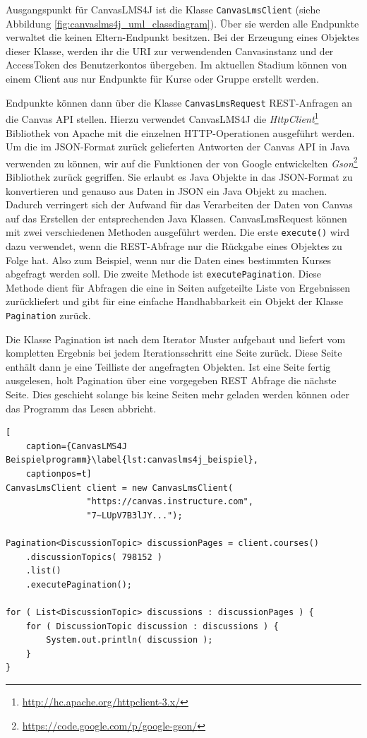 Ausgangspunkt für CanvasLMS4J ist die Klasse \texttt{CanvasLmsClient} (siehe Abbildung \ref{fig:canvaslms4j_uml_classdiagram}). Über sie werden alle Endpunkte verwaltet die keinen Eltern-Endpunkt besitzen. Bei der Erzeugung eines Objektes dieser Klasse, werden ihr die URI zur verwendenden Canvasinstanz und der AccessToken des Benutzerkontos übergeben. Im aktuellen Stadium können von einem Client aus nur Endpunkte für Kurse oder Gruppe erstellt werden.

Endpunkte können dann über die Klasse \texttt{CanvasLmsRequest} REST-Anfragen an die Canvas API stellen. Hierzu verwendet CanvasLMS4J die \emph{HttpClient}\footnote{\url{http://hc.apache.org/httpclient-3.x/}} Bibliothek von Apache mit die einzelnen HTTP-Operationen ausgeführt werden. Um die im JSON-Format zurück gelieferten Antworten der Canvas API in Java verwenden zu können, wir auf die Funktionen der von Google entwickelten \emph{Gson}\footnote{\url{https://code.google.com/p/google-gson/}} Bibliothek zurück gegriffen. Sie erlaubt es Java Objekte in das JSON-Format zu konvertieren und genauso aus Daten in JSON ein Java Objekt zu machen. Dadurch verringert sich der Aufwand für das Verarbeiten der Daten von Canvas auf das Erstellen der entsprechenden Java Klassen. CanvasLmsRequest können mit zwei verschiedenen Methoden ausgeführt werden. Die erste \texttt{execute()} wird dazu verwendet, wenn die REST-Abfrage nur die Rückgabe eines Objektes zu Folge hat. Also zum Beispiel, wenn nur die Daten eines bestimmten Kurses abgefragt werden soll. Die zweite Methode ist \texttt{executePagination}. Diese Methode dient für Abfragen die eine in Seiten aufgeteilte Liste von Ergebnissen zurückliefert und gibt für eine einfache Handhabbarkeit ein Objekt der Klasse \texttt{Pagination} zurück. 

Die Klasse Pagination ist nach dem Iterator Muster aufgebaut und liefert vom kompletten Ergebnis bei jedem Iterationsschritt eine Seite zurück. Diese Seite enthält dann je eine Teilliste der angefragten Objekten. Ist eine Seite fertig ausgelesen, holt Pagination über eine vorgegeben REST Abfrage die nächste Seite. Dies geschieht solange bis keine Seiten mehr geladen werden können oder das Programm das Lesen abbricht.

\begin{lstlisting}[
    caption={CanvasLMS4J Beispielprogramm}\label{lst:canvaslms4j_beispiel},
    captionpos=t]
CanvasLmsClient client = new CanvasLmsClient(
                "https://canvas.instructure.com",
                "7~LUpV7B3lJY...");

Pagination<DiscussionTopic> discussionPages = client.courses()
    .discussionTopics( 798152 )
    .list()
    .executePagination();

for ( List<DiscussionTopic> discussions : discussionPages ) {
    for ( DiscussionTopic discussion : discussions ) {
        System.out.println( discussion );
    }
}

\end{lstlisting}

